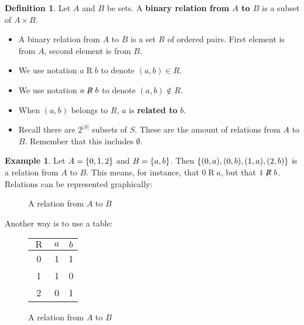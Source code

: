 \documentclass[article, 12pt]{article}
\theoremstyle{definition}
\newtheorem{example}{Example}
\newtheorem{definition}{Definition}
\DeclarePairedDelimiter\set{\{}{\}}
\newcommand{\rel}{\mathrel{R}} %
\begin{document}
    \begin{definition}\label{def:binary relation}
        Let $A$ and $B$ be sets. A \textbf{binary relation from $A$ to $B$} is a subset of $A \times B$.
    \end{definition}
    \begin{itemize}
        \item A binary relation from $A$ to $B$ is a set $R$ of ordered pairs. First element is from $A$, second element is from $B$.
        \item We use notation $a \rel b$ to denote $(a, b) \in R$.
        \item We use notation $a \not \rel b$ to denote $(a, b) \not \in R$.
        \item When $(a,b)$ belongs to $R$, $a$ is \textbf{related to} $b$.
        \item Recall there are $2^{|S|}$ subsets of $S$. These are the amount of relations from $A$ to $B$. Remember that this includes $\emptyset$.

    \end{itemize}
    \begin{example}
        Let $A = \set*{0,1,2}$ and $B=\set*{a,b}$. Then $\set*{(0,a),(0,b),(1,a),(2,b)}$ is a relation from $A$ to $B$. This means, for instance, that $0 \mathrel{R} a$, but that $1 \not \mathrel{R} b$. Relations can be represented graphically:
        \begin{figure}[H]\label{fig:relation}
            \centering
            \caption{A relation from $A$ to $B$}
        \end{figure}
        Another way is to use a table:
        \begin{figure}[H]\label{fig:relation table}

            \centering
            \begin{tabular}{c|c c} 
                $\rel$ & $a$ & $b$ \\
                \hline
                0 & 1 & 1 \\
                1 & 1 & 0 \\
                2 & 0 & 1 \\
            \end{tabular}
            \caption{A relation from $A$ to $B$}
        \end{figure}
    \end{example}
    \setcounter{subsubsection}{2}
\end{document}
